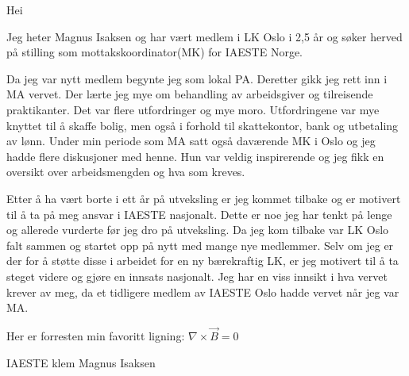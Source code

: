 \documentclass[norsk,12pt]{article}
\begin{document}
Hei
 
Jeg heter Magnus Isaksen og har vært medlem i LK Oslo i 2,5 år og søker herved på stilling som mottakskoordinator(MK) for IAESTE Norge.

Da jeg var nytt medlem begynte jeg som lokal PA. Deretter gikk jeg rett inn i MA vervet. Der lærte jeg mye om behandling av arbeidsgiver og tilreisende praktikanter. Det var flere utfordringer og mye moro. Utfordringene var mye knyttet til å skaffe bolig, men også i forhold til skattekontor, bank og utbetaling av lønn. Under min periode som MA satt også daværende MK i Oslo og jeg hadde flere diskusjoner med henne. Hun var veldig inspirerende og jeg fikk en oversikt over arbeidsmengden og hva som kreves.
 
Etter å ha vært borte i ett år på utveksling er jeg kommet tilbake og er motivert til å ta på meg ansvar i IAESTE nasjonalt. Dette er noe jeg har tenkt på lenge og allerede vurderte før jeg dro på utveksling. Da jeg kom tilbake var LK Oslo falt sammen og startet opp på nytt med mange nye medlemmer. Selv om jeg er der for å støtte disse i arbeidet for en ny bærekraftig LK, er jeg motivert til å ta steget videre og gjøre en innsats nasjonalt. Jeg har en viss innsikt i hva vervet krever av meg, da et tidligere medlem av IAESTE Oslo hadde vervet når jeg var MA. 




Her er forresten min favoritt ligning: 
$\nabla \times \vec{B} = 0$


IAESTE klem
Magnus Isaksen
\end{document}
